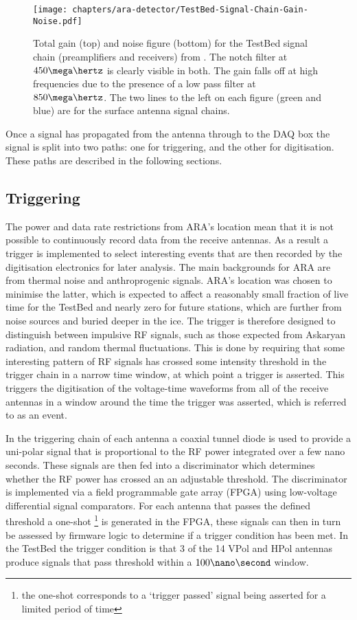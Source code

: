 \begin{figure}[htpb]
  \centering
  \texttt{[image: chapters/ara-detector/TestBed-Signal-Chain-Gain-Noise.pdf]}
  \caption{Total gain (top) and noise figure (bottom) for the TestBed signal chain (preamplifiers and receivers) from \cite{Allison2012457}. The notch filter at $450 \mega\hertz$ is clearly visible in both. The gain falls off at high frequencies due to the presence of a low pass filter at $850 \mega \hertz$. The two lines to the left on each figure (green and blue) are for the surface antenna signal chains.}
  \label{fig:ara-detector:TestBed:Signal-Chain:Gain-Noise}
\end{figure}

Once a signal has propagated from the antenna through to the DAQ box the signal is split into two paths: one for triggering, and the other for digitisation. These paths are described in the following sections.

\subsection{Triggering}
\label{sec:ara-detector:TestBed:Triggering}

The power and data rate restrictions from ARA's location mean that it is not possible to continuously record data from the receive antennas. As a result a trigger is implemented to select interesting events that are then recorded by the digitisation electronics for later analysis. The main backgrounds for ARA are from thermal noise and anthroprogenic signals. ARA's location was chosen to minimise the latter, which is expected to affect a reasonably small fraction of live time for the TestBed and nearly zero for future stations, which are further from noise sources and buried deeper in the ice. The trigger is therefore designed to distinguish between impulsive RF signals, such as those expected from Askaryan radiation, and random thermal fluctuations. This is done by requiring that some interesting pattern of RF signals has crossed some intensity threshold in the trigger chain in a narrow time window, at which point a trigger is asserted. This triggers the digitisation of the voltage-time waveforms from all of the receive antennas in a window around the time the trigger was asserted, which is referred to as an event.

In the triggering chain of each antenna a coaxial tunnel diode is used to provide a uni-polar signal that is proportional to the RF power integrated over a few nano seconds. These signals are then fed into a discriminator which determines whether the RF power has crossed an an adjustable threshold. The discriminator is implemented via a field programmable gate array (FPGA) using low-voltage differential signal comparators. For each antenna that passes the defined threshold a one-shot \footnote{the one-shot corresponds to a `trigger passed' signal being asserted for a limited period of time} is generated in the FPGA, these signals can then in turn be assessed by firmware logic to determine if a trigger condition has been met. In the TestBed the trigger condition is that 3 of the 14 VPol and HPol antennas produce signals that pass threshold within a $100 \nano\second$ window. 

